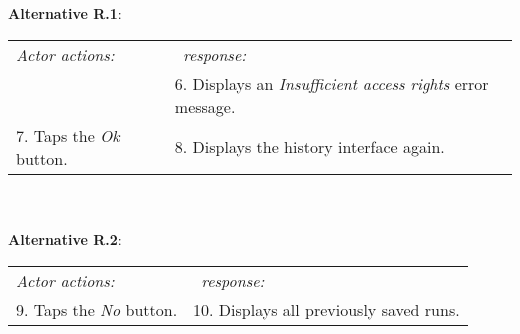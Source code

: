     \\
     \\\textbf{Alternative R.1}: \\
    \begin{tabular}{ p{} p{} }
  	\emph{Actor actions:} & \emph{\projectname\ response:} \\
            & 6. Displays an \emph{Insufficient access rights} error message. \\
    7. Taps the \emph{Ok} button. & 8. Displays the history interface again. \\
    \end{tabular}
    \\
         \\\textbf{Alternative R.2}: \\
        \begin{tabular}{ p{} p{} }
  	\emph{Actor actions:} & \emph{\projectname\ response:} \\
    9. Taps the \emph{No} button. & 10. Displays all previously saved runs. \\
    \end{tabular}
    

